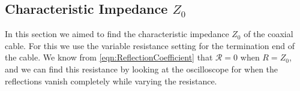 \documentclass[12pt]{article}
\numberwithin{equation}{section}
\numberwithin{figure}{section}
\begin{document}
    \subsection{Characteristic Impedance $Z_0$}\label{sec:CharacteristicImpedance}
    In this section we aimed to find the characteristic impedance $Z_0$ of the coaxial cable. 
    For this we use the variable resistance setting for the termination end of the cable. We know 
    from \autoref{eqn:ReflectionCoefficient} that $\mathcal{R}=0$ when $R=Z_0$, and we can find 
    this resistance by looking at the oscilloscope for when the reflections vanish completely 
    while varying the resistance. 
\end{document}
